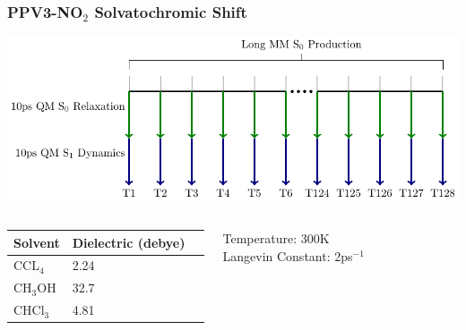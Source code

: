 \documentclass{beamer}
\begin{document}
\begin{frame}
  \frametitle{PPV3-NO$_2$ Solvatochromic Shift }
  \includegraphics[width=\textwidth]{scripted_diagrams/spectra_simulation.pdf}
\begin{columns}[c]
\begin{block}{}
    \begin{table}[]
    \begin{tabular}{lll}
    Solvent &  Dielectric (debye) \\
      \hline
      CCL$_4$ & 2.24  \\
      CH$_3$OH & 32.7 \\
      CHCl$_3$ & 4.81 
    \end{tabular}
    \end{table}

\end{block}

\begin{block}{}
  Temperature: 300K\\
  Langevin Constant: 2ps$^{-1}$
\end{block}
\end{columns}
\end{frame}
\end{document}
